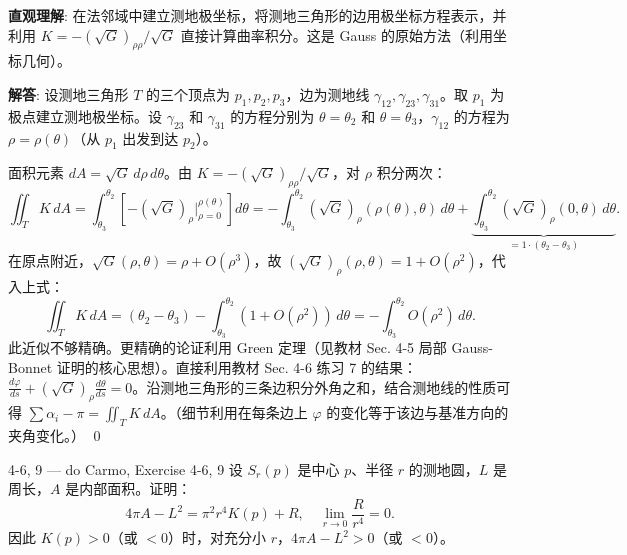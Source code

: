 \begin{solution}
\textbf{直观理解}: 在法邻域中建立测地极坐标，将测地三角形的边用极坐标方程表示，并利用 $K = -(\sqrt{G})_{\rho\rho}/\sqrt{G}$ 直接计算曲率积分。这是 Gauss 的原始方法（利用坐标几何）。

\textbf{解答}: 设测地三角形 $T$ 的三个顶点为 $p_1, p_2, p_3$，边为测地线 $\gamma_{12}, \gamma_{23}, \gamma_{31}$。取 $p_1$ 为极点建立测地极坐标。设 $\gamma_{23}$ 和 $\gamma_{31}$ 的方程分别为 $\theta = \theta_2$ 和 $\theta = \theta_3$，$\gamma_{12}$ 的方程为 $\rho = \rho(\theta)$（从 $p_1$ 出发到达 $p_2$）。

面积元素 $dA = \sqrt{G}\, d\rho\, d\theta$。由 $K = -(\sqrt{G})_{\rho\rho}/\sqrt{G}$，对 $\rho$ 积分两次：
\[
\iint_T K\, dA = \int_{\theta_3}^{\theta_2}\!\left[ -(\sqrt{G})_\rho\Big|_{\rho=0}^{\rho(\theta)} \right] d\theta = -\int_{\theta_3}^{\theta_2}(\sqrt{G})_\rho(\rho(\theta),\theta)\, d\theta + \underbrace{\int_{\theta_3}^{\theta_2}(\sqrt{G})_\rho(0,\theta)\, d\theta}_{=1\cdot(\theta_2-\theta_3)} .
\]
在原点附近，$\sqrt{G}(\rho,\theta) = \rho + O(\rho^3)$，故 $(\sqrt{G})_\rho(\rho,\theta) = 1 + O(\rho^2)$，代入上式：
\[
\iint_T K\, dA = (\theta_2 - \theta_3) - \int_{\theta_3}^{\theta_2}(1 + O(\rho^2))\, d\theta = -\int_{\theta_3}^{\theta_2}O(\rho^2)\, d\theta.
\]
此近似不够精确。更精确的论证利用 Green 定理（见教材 Sec. 4-5 局部 Gauss-Bonnet 证明的核心思想）。直接利用教材 Sec. 4-6 练习 7 的结果：$\frac{d\varphi}{ds} + (\sqrt{G})_\rho\frac{d\theta}{ds} = 0$。沿测地三角形的三条边积分外角之和，结合测地线的性质可得 $\sum\alpha_i - \pi = \iint_T K\, dA$。（细节利用在每条边上 $\varphi$ 的变化等于该边与基准方向的夹角变化。）
\qed
\end{solution}

\begin{exercise}{4-6, 9 — do Carmo, Exercise 4-6, 9}
设 $S_r(p)$ 是中心 $p$、半径 $r$ 的测地圆，$L$ 是周长，$A$ 是内部面积。证明：
\[
4\pi A - L^2 = \pi^2 r^4 K(p) + R,\quad \lim_{r\to 0} \frac{R}{r^4} = 0.
\]
因此 $K(p)>0$（或 $<0$）时，对充分小 $r$，$4\pi A - L^2 > 0$（或 $<0$）。
\end{exercise}

